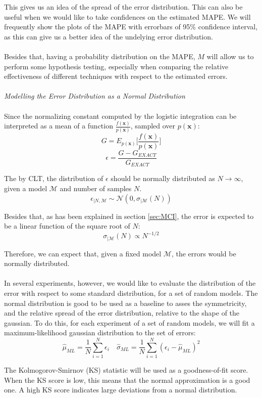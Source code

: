 This gives us an idea of the spread of the error distribution. This can also be useful when we would like to take confidences on the estimated MAPE. We will frequently show the plots of the MAPE with errorbars of 95\% confidence interval, as this can give us a better idea of the undelying error distribution.
\\\\
Besides that, having a probability distribution on the MAPE, \(M\) will allow us to perform some hypothesis testing, especially when comparing the relative effectiveness of different techniques with respect to the estimated errors.
\\\\
\textit{{\large Modelling the Error Distribution as a Normal Distribution}}
\\\\
Since the normalizing constant computed by the logistic integration can be interpreted as a mean of a function \(\frac{f(\mathbf{x})}{p(\mathbf{x})}\), sampled over \(p(\mathbf{x})\):
\[ G = E_{p\mathbf{(x)}} \bigg[ \frac{f(\mathbf{x})}{p\mathbf{(x)}} \bigg]\]
\[ \epsilon = \frac{G - G_{EXACT}}{G_{EXACT}} \]

The by CLT, the distribution of \(\epsilon\) should be normally distributed as \(N \rightarrow \infty\), given a model \( \mathcal{M} \) and number of samples \(N\).
\[ \epsilon_{|N,\mathcal{M}} \sim \mathcal{N}(0, \sigma_{|\mathcal{M}}(N))\]

Besides that, as has been explained in section \ref{sec:MCI}, the error is expected to be a linear function of the square root of \(N\):
\[\sigma_{|\mathcal{M}}(N) \propto N^{-1/2}\]

Therefore, we can expect that, given a fixed model \(\mathcal{M}\), the errors would be normally distributed.
\\\\
In several experiments, however, we would like to evaluate the distribution of the error with respect to some standard distribution, for a set of random models. The normal distribution is good to be used as a baseline to asses the symmetricity, and the relative spread of the error distribution, relative to the shape of the gaussian. To do this, for each experiment of a set of random models, we will fit a maximum-likelihood gaussian distribution to the set of errors:
\[\hat{\mu}_{ML} = \frac{1}{N} \sum_{i=1}^N \epsilon_i \quad \hat{\sigma}_{ML} = \frac{1}{N}\sum_{i=1}^N (\epsilon_i - \hat{\mu}_{ML})^2\]

The Kolmogorov-Smirnov (KS) statistic will be used as a goodness-of-fit score. When the KS score is low, this means that the normal approximation is a good one. A high KS score indicates large deviations from a normal distribution. 
 

